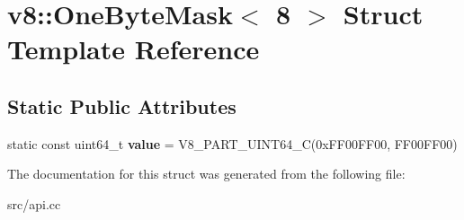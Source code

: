 \hypertarget{structv8_1_1_one_byte_mask_3_018_01_4}{}\section{v8\+:\+:One\+Byte\+Mask$<$ 8 $>$ Struct Template Reference}
\label{structv8_1_1_one_byte_mask_3_018_01_4}
\subsection*{Static Public Attributes}
\begin{DoxyCompactItemize}
\item 
\hypertarget{structv8_1_1_one_byte_mask_3_018_01_4_a83c02b01faa83dddabc00e630be15458}{}static const uint64\+\_\+t {\bfseries value} = V8\+\_\+P\+A\+R\+T\+\_\+\+U\+I\+N\+T64\+\_\+\+C(0x\+F\+F00\+F\+F00, F\+F00\+F\+F00)\label{structv8_1_1_one_byte_mask_3_018_01_4_a83c02b01faa83dddabc00e630be15458}

\end{DoxyCompactItemize}


The documentation for this struct was generated from the following file\+:\begin{DoxyCompactItemize}
\item 
src/api.\+cc\end{DoxyCompactItemize}

